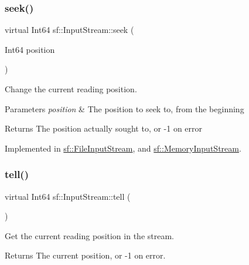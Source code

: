 \subsubsection{\texorpdfstring{seek()}{seek()}}
{\footnotesize\ttfamily virtual Int64 sf\+::\+Input\+Stream\+::seek (\begin{DoxyParamCaption}\item[{Int64}]{position }\end{DoxyParamCaption})\hspace{0.3cm}{\ttfamily [pure virtual]}}



Change the current reading position. 


\begin{DoxyParams}{Parameters}
{\em position} & The position to seek to, from the beginning\\
\hline
\end{DoxyParams}
\begin{DoxyReturn}{Returns}
The position actually sought to, or -\/1 on error \begin{DoxyVerb}\end{DoxyVerb}
 
\end{DoxyReturn}


Implemented in \mbox{\hyperlink{classsf_1_1_file_input_stream_abdaf5700d4e1de07568e7829106b4eb9}{sf\+::\+File\+Input\+Stream}}, and \mbox{\hyperlink{classsf_1_1_memory_input_stream_aa2ac8fda2bdb4c95248ae90c71633034}{sf\+::\+Memory\+Input\+Stream}}.

\mbox{\label{classsf_1_1_input_stream_a599515b9ccdbddb6fef5a98424fd559c}} 
\subsubsection{\texorpdfstring{tell()}{tell()}}
{\footnotesize\ttfamily virtual Int64 sf\+::\+Input\+Stream\+::tell (\begin{DoxyParamCaption}{ }\end{DoxyParamCaption})\hspace{0.3cm}{\ttfamily [pure virtual]}}



Get the current reading position in the stream. 

\begin{DoxyReturn}{Returns}
The current position, or -\/1 on error. \begin{DoxyVerb}\end{DoxyVerb}
 
\end{DoxyReturn}


